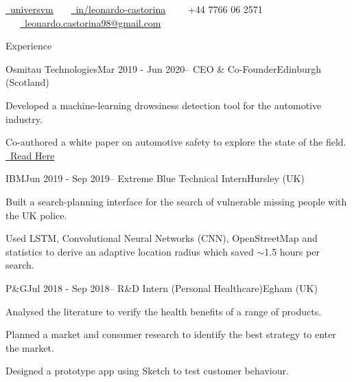 \documentclass{resume} %
\begin{document}
{\centering
    \href{https://github.com/universvm}{\faGithub \ universvm} \ \ \   
\href{https://www.linkedin.com/in/leonardo-castorina/}{\faLinkedin \ in/leonardo-castorina} \ \ \  
{\faPhone \ +44 7766 06 2571} \ \ \   
 \href{mailto:leonardo.castorina98@gmail.com}{\faEnvelope \ leonardo.castorina98@gmail.com}
\par}


\begin{rSection}{Experience}

\begin{rSubsection}{Osmitau Technologies}{Mar 2019 - Jun 2020}{– CEO \& Co-Founder}{Edinburgh (Scotland)}
\item Developed a machine-learning drowsiness detection tool for the
automotive industry.
\item Co-authored a white paper on automotive safety to explore the state of
the field. \fontsize{8pt}{12pt}\selectfont\href{https://osmitau.com/solutions.html}{ \faGlobe \ Read Here}
\end{rSubsection}


\begin{rSubsection}{IBM}{Jun 2019 - Sep 2019}{– Extreme Blue Technical Intern}{Hursley (UK)}
\item Built a search-planning interface for the search of vulnerable missing people with the UK police. 
\item Used LSTM, Convolutional Neural Networks (CNN), OpenStreetMap and statistics to derive an adaptive location radius which saved $\sim$1.5 hours per search.
\end{rSubsection}



\begin{rSubsection}{P\&G}{Jul 2018 - Sep 2018}{– R\&D Intern (Personal Healthcare)}{Egham (UK)}
\item Analysed the literature to verify the health benefits of a range of products. 
\item Planned a market and consumer research to identify the best strategy to enter the market. 
\item Designed a prototype app using Sketch to test customer behaviour.



\end{rSubsection}
\end{rSection}
\end{document}
